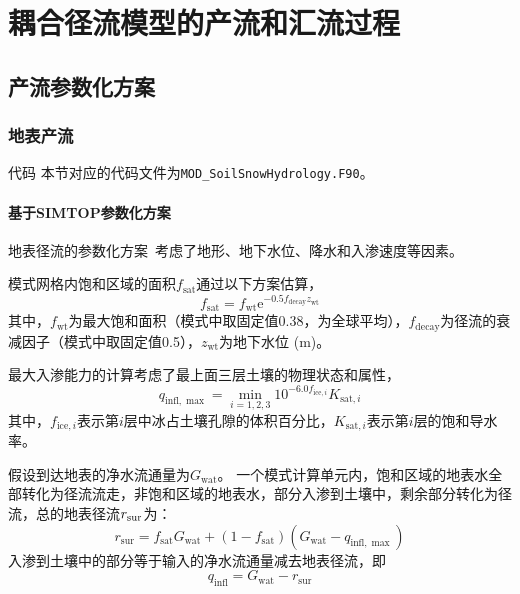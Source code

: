 \chapter{耦合径流模型的产流和汇流过程}

\section{产流参数化方案}

\subsection{地表产流}
\begin{mymdframed}{代码}
  本节对应的代码文件为\texttt{MOD\_SoilSnowHydrology.F90}。
\end{mymdframed}
\subsubsection{基于SIMTOP参数化方案}
地表径流的参数化方案~\citep{niu2005simple}考虑了地形、地下水位、降水和入渗速度等因素。

模式网格内饱和区域的面积$f_{\mathrm{sat}}$通过以下方案估算，
\begin{equation}
  f_{\mathrm{sat}}=f_{\mathrm{wt}}  \mathrm{e}^{-0.5  f_{\mathrm{decay}}  z_{\mathrm{wt}}}
\end{equation}
其中，$f_{\mathrm{wt}}$为最大饱和面积（模式中取固定值0.38，为全球平均），$f_{\mathrm{decay}}$为径流的衰减因子（模式中取固定值0.5），$z_{\mathrm{wt}}$为地下水位 (m)。

最大入渗能力的计算考虑了最上面三层土壤的物理状态和属性，
\begin{equation}
  q_{\mathrm{infl}, \max }= \min _{i=1,2,3} 10^{-6.0  f_{\mathrm{ice}, i}}  K_{\mathrm{sat}, i}
\end{equation}
其中，$f_{\mathrm{ice},i}$表示第$i$层中冰占土壤孔隙的体积百分比，$K_{\mathrm{sat},i}$表示第$i$层的饱和导水率。

假设到达地表的净水流通量为$G_{\mathrm{wat}}$。 一个模式计算单元内，饱和区域的地表水全部转化为径流流走，非饱和区域的地表水，部分入渗到土壤中，剩余部分转化为径流，总的地表径流$r_{\rm sur}$为：
\begin{equation}
  r_{\mathrm{sur}}=f_{\mathrm{sat}} G_{\mathrm{wat}}+\left(1-f_{\mathrm{sat}}\right)  \left(G_{\mathrm{wat}}-q_{\mathrm{infl},\max}\right)
\end{equation}
入渗到土壤中的部分等于输入的净水流通量减去地表径流，即
\begin{equation}
  q_{\mathrm{infl}}={G}_{\mathrm{wat}}-r_{\mathrm{sur}}
\end{equation}
